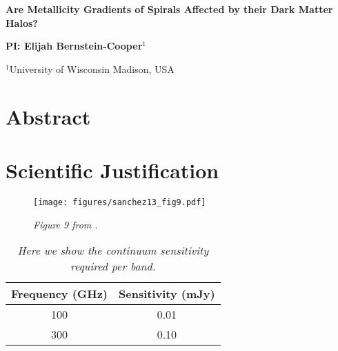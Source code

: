 \documentclass[12pt,a4paper]{article}
\begin{document}
\pagestyle{plain}
 

\begin{center}
{\LARGE{\bf
{Are Metallicity Gradients of Spirals Affected by their Dark Matter Halos?}
}}
\end{center}
\bigskip

\centerline{\bf PI:\@
{Elijah Bernstein-Cooper}$^1$}

\smallskip
$^1$University of Wisconsin Madison, USA
\smallskip


\section{Abstract}\label{sec:abstract}







\section{Scientific Justification}




\begin{figure}[tbh]
    
    \texttt{[image: figures/sanchez13\_fig9.pdf]}

    \caption{\em{Figure 9 from \citet{sanchez13}.}\/}

\end{figure}


\begin{table}[!ht]
\begin{center}
\caption[]{\em{Here we show the continuum sensitivity required per band.}\/}
\begin{tabular}{cc}
\hline \noalign{\smallskip}
Frequency (GHz) & Sensitivity (mJy) \\
\hline \noalign{\smallskip}
100 & 0.01 \\
300 & 0.10 \\
\end{tabular}
\end{center}
\end{table}
\end{document}
